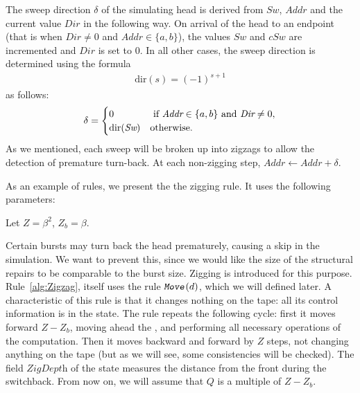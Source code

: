 \documentclass[12pt]{memoir}
\newcommand{\fld}[1]{\ensuremath{\textit{#1}}}
\newcommand{\rul}[1]{\ensuremath{\texttt{\slshape #1\/}}}
\newcommand{\Z}{Z}
\newcommand{\Addr}{\fld{Addr}}
\newcommand{\Dir}{\fld{Dir}}
\newcommand{\Sweep}{\fld{Sw}}
\newcommand{\cSweep}{\fld{cSw}}
\newcommand{\ZigDepth}{\fld{ZigDepth}}
\newcommand{\dir}{\mathrm{dir}}
\newcommand{\Move}{\rul{Move}}
\begin{document}
    The sweep direction \( \delta \) of the simulating head is derived from
    \( \Sweep \), \( \Addr \) and the current value \( \Dir \) in the following way.
    On arrival of the head to an endpoint (that is
    when \( \Dir \neq 0 \) and \( \Addr\in\{a,b\} \)), the values
    \( \Sweep \) and \( \cSweep \) are incremented and \( \Dir \) is set to 0.
    In all other cases, the sweep direction is determined
    using the formula
     \begin{align}\label{eq:sweep-dir}
       \dir(s)=(-1)^{s + 1}
     \end{align}
as follows: 
    \begin{equation}\label{eq:Dir}
    \delta =
      \begin{cases}
         0 & \text{ if \( \Addr\in\{a,b\} \) and \( \Dir\neq 0 \)},  \\
           \dir(\Sweep) &\text{otherwise}.
         \end{cases}
    \end{equation}
As we mentioned, each sweep will be broken up into zigzags to
allow the detection of premature turn-back.
At each non-zigging step, \( \Addr \gets \Addr+\delta \).

As an example of rules, we present the the zigging rule.
It uses the following parameters:

\begin{definition}\label{def:Z}
Let \( \Z = \beta^{2} \), \( \Z_{b} = \beta \).  %
\end{definition}

Certain bursts may turn back the head prematurely,
causing a skip in the simulation.
We want to prevent this, since we 
would like the size of the structural repairs to be comparable to the burst size.
Zigging is introduced for this purpose.
Rule~\ref{alg:Zigzag}, itself uses the rule \( \Move(d) \), which 
we will defined later.  %
A characteristic of this rule is that it changes nothing on the tape:
all its control information is in the state.
The rule repeats the following cycle: first it moves forward \( \Z-\Z_{b} \),
moving ahead the , and performing all necessary operations
of the computation.
Then it moves backward and forward by \( \Z \) steps, not changing anything
on the tape (but as we will see, some consistencies will be checked).
The field \( \ZigDepth \) of the state measures the distance from the front
during the switchback.
From now on, we will assume that \( Q \) is a multiple of \( \Z-\Z_{b} \).
\end{document}

